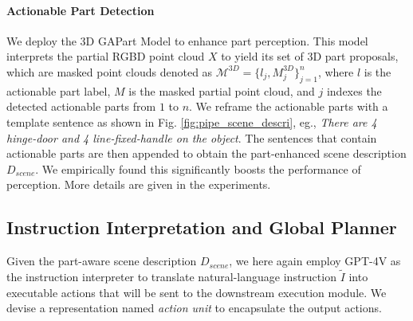 \paragraph{Actionable Part Detection}
%
%
We deploy the 3D GAPart Model \citep{geng2022gapartnet} to enhance part perception. This model interprets the partial RGBD point cloud $X$ to yield its set of 3D part proposals, which are masked point clouds denoted as $\mathcal{M}^{3D} = \{l_j, M_j^{3D}\}_{j=1}^n$, where $l$ is the actionable part label, ${M}$ is the masked partial point cloud, and $j$ indexes the detected actionable parts from $1$ to $n$. We reframe the actionable parts with a template sentence as shown in Fig. \ref{fig:pipe_scene_descri}, eg., \textit{There are 4 hinge-door and 4 line-fixed-handle on the object}. The sentences that contain actionable parts are then appended to obtain the part-enhanced scene description ${D}_{scene}$. We empirically found this significantly boosts the performance of perception. More details are given in the experiments.

\subsection{Instruction Interpretation and Global Planner}
\label{language_method}
Given the part-aware scene description ${D}_{scene}$, we here again employ GPT-4V \citep{openai2023gpt4} as the instruction interpreter to translate natural-language instruction $\tilde{I}$ into executable actions that will be sent to the downstream execution module. 
We devise a representation named \textit{action unit} to encapsulate the output actions.

